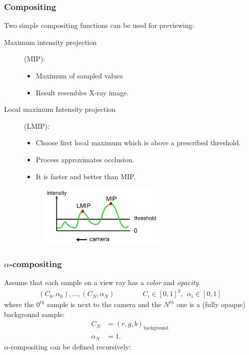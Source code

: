 \subsubsection{Compositing}
Two simple compositing functions can be used for previewing:
\begin{description}
    \item[Maximum intensity projection] (MIP):
        \begin{itemize}
            \item Maximum of sampled values
            \item Result resembles X-ray image.
        \end{itemize}
    \item[Local maximum Intensity projection] (LMIP):
        \begin{itemize}
            \item Choose first local maximum which is above a prescribed threshold.
            \item Process approximates occlusion.
            \item It is faster and better than MIP.
        \end{itemize}
        \begin{figure}[H]
            \centering
            \includegraphics[width=0.6\textwidth]{img/03_lmip}
        \end{figure}
\end{description}

\subsubsection{$\alpha$-compositing}
Assume that each sample on a view ray has a \emph{color} and \emph{opacity}.
\begin{align*}
    (C_0,\alpha_0), \ldots, (C_N,\alpha_N)\qquad\qquad C_i\in [0,1]^3,\ \ \alpha_i\in [0,1]
\end{align*}
where the $0^{th}$ sample is next to the camera and the $N^{th}$ one is a (fully opaque) background sample:
\begin{align*}
    C_N &= (r,g,b)_\text{background}\\
    \alpha_N &= 1.
\end{align*}
$\alpha$-compositing can be defined recursively:

